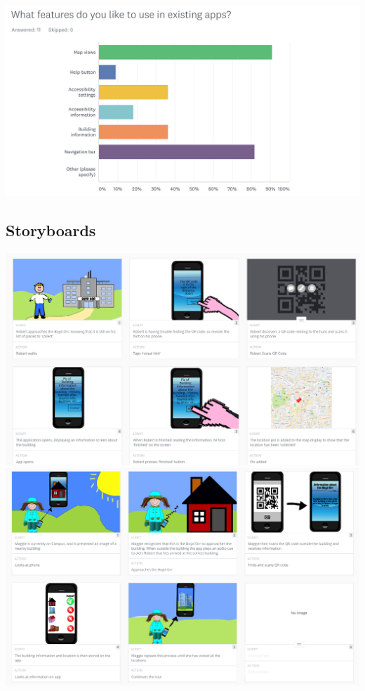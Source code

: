 \documentclass[a4,10pt,twocolumn]{article}
\begin{document}
\noindent\includegraphics[width=\columnwidth]{Question6.png}

\subsection{Storyboards}
\label{app:storyboards}
\noindent\includegraphics[width=\columnwidth]{storyboard1.PNG}
\noindent\includegraphics[width=\columnwidth]{storyboard2.png}
\end{document}
